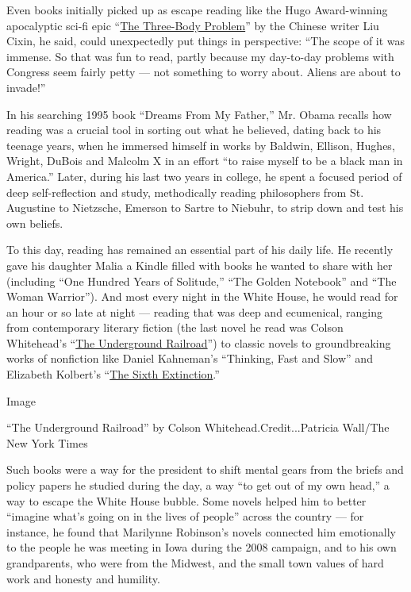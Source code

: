 Even books initially picked up as escape reading like the Hugo
Award-winning apocalyptic sci-fi epic
``\href{https://www.nytimes3xbfgragh.onion/2014/11/11/books/liu-cixins-the-three-body-problem-is-published-in-us.html}{The
Three-Body Problem}'' by the Chinese writer Liu Cixin, he said, could
unexpectedly put things in perspective: ``The scope of it was immense.
So that was fun to read, partly because my day-to-day problems with
Congress seem fairly petty --- not something to worry about. Aliens are
about to invade!''

In his searching 1995 book ``Dreams From My Father,'' Mr. Obama recalls
how reading was a crucial tool in sorting out what he believed, dating
back to his teenage years, when he immersed himself in works by Baldwin,
Ellison, Hughes, Wright, DuBois and Malcolm X in an effort ``to raise
myself to be a black man in America.'' Later, during his last two years
in college, he spent a focused period of deep self-reflection and study,
methodically reading philosophers from St. Augustine to Nietzsche,
Emerson to Sartre to Niebuhr, to strip down and test his own beliefs.

To this day, reading has remained an essential part of his daily life.
He recently gave his daughter Malia a Kindle filled with books he wanted
to share with her (including ``One Hundred Years of Solitude,'' ``The
Golden Notebook'' and ``The Woman Warrior''). And most every night in
the White House, he would read for an hour or so late at night ---
reading that was deep and ecumenical, ranging from contemporary literary
fiction (the last novel he read was Colson Whitehead's
``\href{https://www.nytimes3xbfgragh.onion/2016/08/03/books/review-the-underground-railroad-colson-whitehead.html?_r=0}{The
Underground Railroad}'') to classic novels to groundbreaking works of
nonfiction like Daniel Kahneman's ``Thinking, Fast and Slow'' and
Elizabeth Kolbert's
``\href{https://www.nytimes3xbfgragh.onion/2014/02/03/books/the-sixth-extinction-on-endangered-and-departed-species.html}{The
Sixth Extinction}.''

Image

``The Underground Railroad'' by Colson Whitehead.Credit...Patricia
Wall/The New York Times

Such books were a way for the president to shift mental gears from the
briefs and policy papers he studied during the day, a way ``to get out
of my own head,'' a way to escape the White House bubble. Some novels
helped him to better ``imagine what's going on in the lives of people''
across the country --- for instance, he found that Marilynne Robinson's
novels connected him emotionally to the people he was meeting in Iowa
during the 2008 campaign, and to his own grandparents, who were from the
Midwest, and the small town values of hard work and honesty and
humility.

